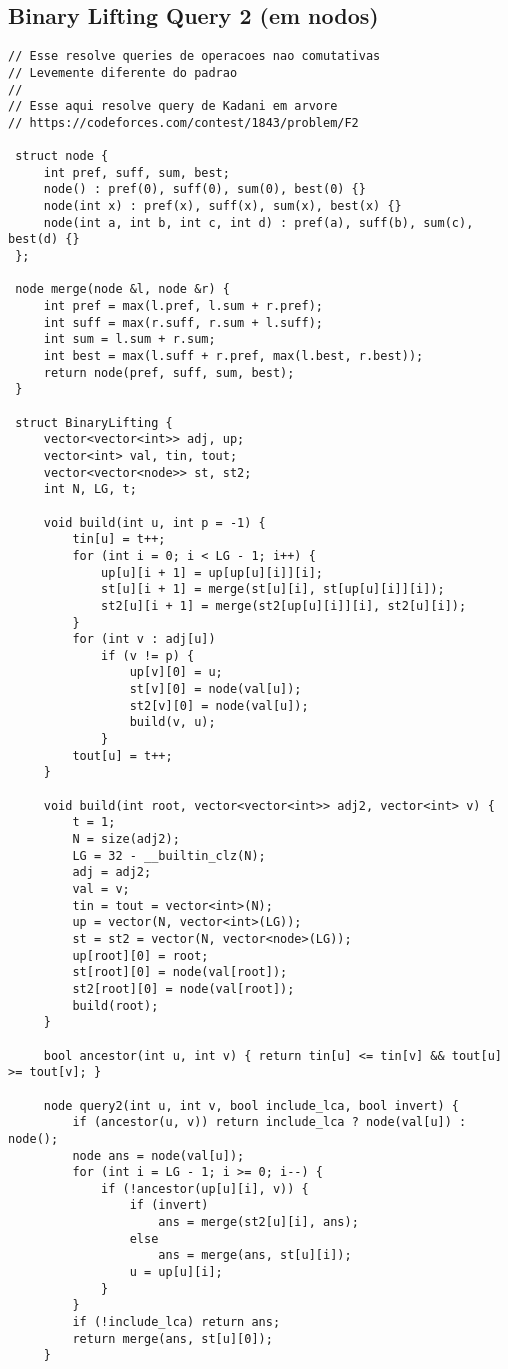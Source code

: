 \documentclass[11pt, a4paper, twoside]{article}
\begin{document}
\subsection{Binary Lifting Query 2 (em nodos)}
\begin{lstlisting}
// Esse resolve queries de operacoes nao comutativas
// Levemente diferente do padrao
//
// Esse aqui resolve query de Kadani em arvore
// https://codeforces.com/contest/1843/problem/F2

 struct node {
     int pref, suff, sum, best;
     node() : pref(0), suff(0), sum(0), best(0) {}
     node(int x) : pref(x), suff(x), sum(x), best(x) {}
     node(int a, int b, int c, int d) : pref(a), suff(b), sum(c), best(d) {}
 };
 
 node merge(node &l, node &r) {
     int pref = max(l.pref, l.sum + r.pref);
     int suff = max(r.suff, r.sum + l.suff);
     int sum = l.sum + r.sum;
     int best = max(l.suff + r.pref, max(l.best, r.best));
     return node(pref, suff, sum, best);
 }
 
 struct BinaryLifting {
     vector<vector<int>> adj, up;
     vector<int> val, tin, tout;
     vector<vector<node>> st, st2;
     int N, LG, t;
 
     void build(int u, int p = -1) {
         tin[u] = t++;
         for (int i = 0; i < LG - 1; i++) {
             up[u][i + 1] = up[up[u][i]][i];
             st[u][i + 1] = merge(st[u][i], st[up[u][i]][i]);
             st2[u][i + 1] = merge(st2[up[u][i]][i], st2[u][i]);
         }
         for (int v : adj[u])
             if (v != p) {
                 up[v][0] = u;
                 st[v][0] = node(val[u]);
                 st2[v][0] = node(val[u]);
                 build(v, u);
             }
         tout[u] = t++;
     }
 
     void build(int root, vector<vector<int>> adj2, vector<int> v) {
         t = 1;
         N = size(adj2);
         LG = 32 - __builtin_clz(N);
         adj = adj2;
         val = v;
         tin = tout = vector<int>(N);
         up = vector(N, vector<int>(LG));
         st = st2 = vector(N, vector<node>(LG));
         up[root][0] = root;
         st[root][0] = node(val[root]);
         st2[root][0] = node(val[root]);
         build(root);
     }
 
     bool ancestor(int u, int v) { return tin[u] <= tin[v] && tout[u] >= tout[v]; }
 
     node query2(int u, int v, bool include_lca, bool invert) {
         if (ancestor(u, v)) return include_lca ? node(val[u]) : node();
         node ans = node(val[u]);
         for (int i = LG - 1; i >= 0; i--) {
             if (!ancestor(up[u][i], v)) {
                 if (invert)
                     ans = merge(st2[u][i], ans);
                 else
                     ans = merge(ans, st[u][i]);
                 u = up[u][i];
             }
         }
         if (!include_lca) return ans;
         return merge(ans, st[u][0]);
     }
 

\end{lstlisting}
\end{document}
